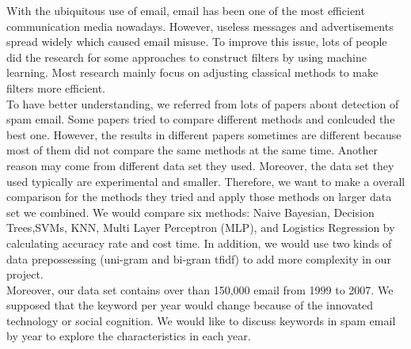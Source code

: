 
With the ubiquitous use of email, email has been one of the most efficient communication media nowadays. However, useless messages and advertisements spread widely which caused email misuse. To improve this issue, lots of people did the research for some approaches to construct filters by using machine learning. Most research mainly focus on adjusting classical methods to make filters more efficient.\\

To have better understanding, we referred from lots of papers about detection of spam email. Some papers tried to compare different methods and conlcuded the best one. However, the results in different papers sometimes are different because most of them did not compare the same methods at the same time. Another reason may come from different data set they used. Moreover, the data set they used typically are experimental and smaller. Therefore, we want to make a overall comparison for the methods they tried and apply those methods on larger data set we combined. We would compare six methods: Naive Bayesian, Decision Trees,SVMs, KNN, Multi Layer Perceptron (MLP), and Logistics Regression by calculating accuracy rate and cost time. In addition, we would use two kinds of data prepossessing (uni-gram and bi-gram tfidf) to add more complexity in our project.\\

Moreover, our data set contains over than 150,000 email from 1999 to 2007. We supposed that the keyword per year would change because of the innovated technology or social cognition. We would like to discuss keywords in spam email by year to explore the characteristics in each year.\\


